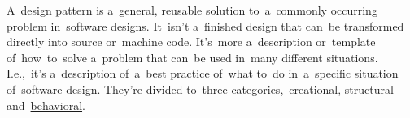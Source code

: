 \label{designpatterns}
A~design pattern is a~general, reusable solution to~a~commonly occurring problem in~software \hyperref[architecturedesign]{designs}. It~isn't a~finished design that can~be transformed directly into source or~machine code. It's~more a~description or~template of~how~to~solve a~problem that can~be used in~many different situations. I.e.,~it's a~description of~a~best practice of~what to~do in~a~specific situation of~software design. They're divided to~three categories,\--\,\hyperref[creationaldp]{creational}, \hyperref[structuraldp]{structural} and~\hyperref[behavioraldp]{behavioral}.

\label{creationaldp}

\label{factorydp}

\label{singletondp}

\label{prototypedp}

\label{structuraldp}

\label{proxydp}

\label{behavioraldp}

\label{nulldp}
